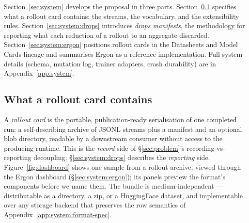 \documentclass{article}
\begin{document}
%

Section~\ref{sec:system} develops the proposal in three parts.
Section~\ref{sec:system:format} specifies what a rollout card
contains: the streams, the vocabulary, and the extensibility
rules. Section~\ref{sec:system:drops} introduces \emph{drops
manifests}, the methodology for reporting what each reduction
of a rollout to an aggregate discarded.
Section~\ref{sec:system:ergon} positions rollout cards in the
Datasheets and Model Cards lineage and summarises Ergon as a
reference implementation. Full system details (schema,
mutation log, trainer adapters, crash durability) are in
Appendix~\ref{app:system}.

\subsection{What a rollout card contains}
\label{sec:system:format}

A \emph{rollout card} is the portable, publication-ready
serialisation of one completed run: a self-describing archive
of JSONL streams plus a manifest and an optional blob
directory, readable by a downstream consumer without access to
the producing runtime. This is the \emph{record} side of
\S\ref{sec:problem}'s recording-vs-reporting decoupling;
\S\ref{sec:system:drops} describes the \emph{reporting} side.
Figure~\ref{fig:dashboard} shows one sample from a rollout
archive, viewed through the Ergon dashboard
(\S\ref{sec:system:ergon}); its panels preview the format's
components before we name them. The bundle is
medium-independent --- distributable as a directory, a zip, or
a HuggingFace dataset, and implementable over any storage
backend that preserves the row semantics of
Appendix~\ref{app:system:format-spec}.
\end{document}
